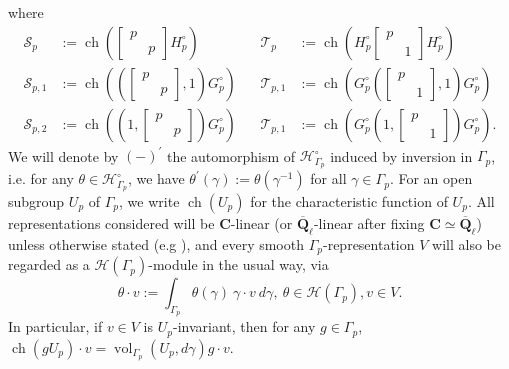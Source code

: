\documentclass{amsart}%
\theoremstyle{plain}
\theoremstyle{plain}
\theoremstyle{remark}
\DeclareMathOperator{\ch}{ch}
\DeclareMathOperator{\vol}{vol}
\begin{document}
where
\begin{equation*}
\begin{split}
\mathcal{S}_p&:=\ch\left(\left[\begin{smallmatrix}
    p & \\
    & p
\end{smallmatrix}\right]H_p^\circ\right)\\
\mathcal{S}_{p,1}&:=\ch\left(\left(\left[\begin{smallmatrix}
    p & \\
    & p
\end{smallmatrix}\right],1\right)G_p^\circ\right)\\
\mathcal{S}_{p,2}&:=\ch\left(\left(1,\left[\begin{smallmatrix}
    p & \\
    & p
\end{smallmatrix}\right]\right)G_p^\circ\right)
\end{split}\ \ \ \ 
\begin{split}
\mathcal{T}_p&:=\ch\left(H_p^\circ\left[\begin{smallmatrix}
    p & \\
    & 1
\end{smallmatrix}\right] H_p^\circ\right)\\
\mathcal{T}_{p,1}&:= \ch\left(G_p^\circ\left(\left[\begin{smallmatrix}
    p & \\
    & 1
\end{smallmatrix}\right],1\right)G_p^\circ\right)\\
\mathcal{T}_{p,1}&:=\ch\left(G_p^\circ\left(1,\left[\begin{smallmatrix}
    p & \\
    & 1
\end{smallmatrix}\right]\right)G_p^\circ\right).
\end{split}
\end{equation*}
  We will denote by $(-)^{'}$ the automorphism of $\mathcal{H}_{\Gamma_p}^\circ$ induced by inversion in $\Gamma_p$, i.e. for any $\theta\in\mathcal{H}_{\Gamma_p}^\circ$, we have $\theta^{'}(\gamma):=\theta(\gamma^{-1})$ for all $\gamma\in \Gamma_p$. 
For an open subgroup $U_p$ of $\Gamma_p$, we write $\ch(U_p)$ for the characteristic function of $U_p$. All representations considered will be $\mathbf{C}$-linear (or $\overline{\mathbf{Q}}_\ell$-linear after fixing $\mathbf{C}\simeq\overline{\mathbf{Q}}_\ell$) unless otherwise stated (e.g ), and every smooth $\Gamma_p$-representation $V$ will also be regarded as a $\mathcal{H}(\Gamma_p)$-module in the usual way, via $$\theta\cdot v:=\int_{\Gamma_p}\theta(\gamma)\ \gamma\cdot v\ d\gamma,\ \theta\in\mathcal{H}(\Gamma_p), v\in V.$$ 
In particular, if $v\in V$ is $U_p$-invariant, then for any $g\in\Gamma_p$, $\ch(g U_p)\cdot v=\vol_{\Gamma_p}(U_p,d\gamma) g\cdot v$.
\end{document}
